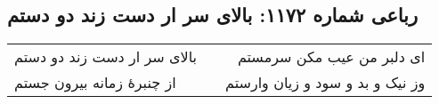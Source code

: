 \begin{center}
\section*{رباعی شماره ۱۱۷۲: بالای سر ار دست زند دو دستم}
\label{sec:1172}
\begin{longtable}{l p{0.5cm} r}
بالای سر ار دست زند دو دستم
&&
ای دلبر من عیب مکن سرمستم
\\
از چنبرهٔ زمانه بیرون جستم
&&
وز نیک و بد و سود و زیان وارستم
\\
\end{longtable}
\end{center}

